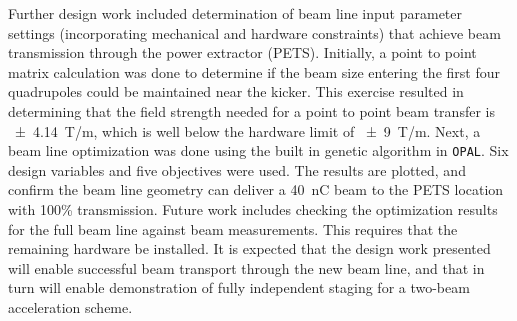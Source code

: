 Further design work included determination of beam line input parameter settings (incorporating 
mechanical and hardware constraints) that achieve beam transmission through the power extractor (PETS).
Initially, a point to point matrix calculation was done to determine if the 
beam size entering the first four quadrupoles could be maintained near the kicker.
This exercise resulted in determining that the field strength needed for a point to point beam transfer is \SI{\pm 4.14}{T/m}, 
which is well below the hardware limit of \SI{\pm9}{T/m}. 
Next, a beam line optimization was done using the built in genetic algorithm in \verb|OPAL|.  
Six design variables and five objectives were used. 
The results are plotted, and confirm the beam line geometry can deliver 
a \SI{40}{nC} beam to the PETS location with 100\% transmission.
Future work includes checking the optimization results for the full beam line against beam measurements.  
This requires that the remaining hardware be installed.  
It is expected that the design work presented will enable successful beam transport through the new beam line, 
and that in turn will enable demonstration of fully independent staging for a two-beam acceleration scheme. 

 












